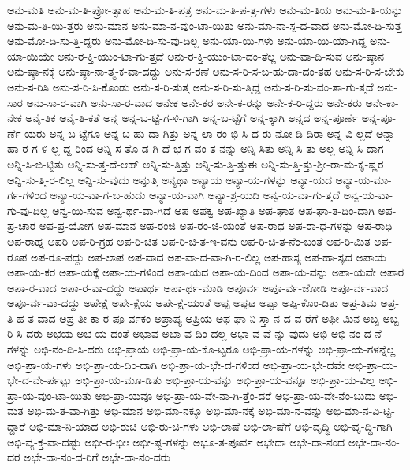 {ಅನು-ಮತಿ
ಅನು-ಮ-ತಿ-ಪ್ರೋ-ತ್ಸಾಹ
ಅನು-ಮ-ತಿ-ಪತ್ರ
ಅನು-ಮ-ತಿ-ಪ-ತ್ರ-ಗಳು
ಅನು-ಮ-ತಿಯ
ಅನು-ಮ-ತಿ-ಯನ್ನು
ಅನು-ಮ-ತಿ-ಯಿ-ತ್ತರು
ಅನು-ಮಾನ
ಅನು-ಮಾ-ನ-ವುಂ-ಟಾ-ಯಿತು
ಅನು-ಮಾ-ನಾ-ಸ್ಪ-ದ-ವಾದ
ಅನು-ಮೋ-ದಿ-ಸುತ್ತ
ಅನು-ಮೋ-ದಿ-ಸು-ತ್ತಿ-ದ್ದರು
ಅನು-ಮೋ-ದಿ-ಸು-ವು-ದಿಲ್ಲ
ಅನು-ಯಾ-ಯಿ-ಗಳು
ಅನು-ಯಾ-ಯಿ-ಯಾ-ಗಿದ್ದ
ಅನು-ಯಾ-ಯಿಯೇ
ಅನು-ರ-ಕ್ತಿ-ಯುಂ-ಟಾ-ಗು-ತ್ತದೆ
ಅನು-ರ-ಕ್ತಿ-ಯುಂ-ಟಾ-ದಂ-ತೆಲ್ಲ
ಅನು-ವಾ-ದಿ-ಸುವ
ಅನು-ಷ್ಠಾನ
ಅನು-ಷ್ಠಾ-ನಕ್ಕೆ
ಅನು-ಷ್ಠಾ-ನಾ-ತ್ಮ-ಕ-ವಾ-ದದ್ದು
ಅನು-ಸ-ರಣೆ
ಅನು-ಸ-ರಿ-ಸ-ಬ-ಹು-ದಾ-ದಂ-ತಹ
ಅನು-ಸ-ರಿ-ಸ-ಬೇಕು
ಅನು-ಸ-ರಿಸಿ
ಅನು-ಸ-ರಿ-ಸಿ-ಕೊಂಡು
ಅನು-ಸ-ರಿ-ಸುತ್ತ
ಅನು-ಸ-ರಿ-ಸು-ತ್ತಿದ್ದ
ಅನು-ಸ-ರಿ-ಸು-ವಂ-ತಾ-ಗು-ತ್ತದೆ
ಅನು-ಸಾರ
ಅನು-ಸಾ-ರ-ವಾಗಿ
ಅನು-ಸಾ-ರ-ವಾದ
ಅನೇಕ
ಅನೇ-ಕರ
ಅನೇ-ಕ-ರನ್ನು
ಅನೇ-ಕ-ರಿ-ದ್ದರು
ಅನೇ-ಕರು
ಅನೇ-ಕಾ-ನೇಕ
ಅನೈ-ತಿಕ
ಅನೈ-ತಿ-ಕತೆ
ಅನ್ನ
ಅನ್ನ-ಬ-ಟ್ಟೆ-ಗ-ಳಿ-ಗಾಗಿ
ಅನ್ನ-ಬ-ಟ್ಟೆಗೆ
ಅನ್ನ-ಕ್ಕಾಗಿ
ಅನ್ನದ
ಅನ್ನ-ಪೂರ್ಣೆ
ಅನ್ನ-ಪೂ-ರ್ಣೆ-ಯರು
ಅನ್ನ-ಬ-ಟ್ಟೆಗೂ
ಅನ್ನ-ಬ-ಹು-ದಾ-ಗಿತ್ತು
ಅನ್ನ-ಲಾ-ರಂ-ಭಿ-ಸಿ-ದ-ರು-ನೋ-ಡಿ-ದಿರಾ
ಅನ್ನ-ವಿ-ಲ್ಲದೆ
ಅನ್ನಾ-ಹಾ-ರ-ಗ-ಳಿ-ಲ್ಲ-ದ್ದ-ರಿಂದ
ಅನ್ನಿ-ಸ-ತೊ-ಡ-ಗಿ-ದೆ-ಭ-ಗ-ವಂ-ತ-ನನ್ನು
ಅನ್ನಿ-ಸಿತು
ಅನ್ನಿ-ಸಿ-ತು-ಅಲ್ಲ
ಅನ್ನಿ-ಸಿ-ದಾಗ
ಅನ್ನಿ-ಸಿ-ಬಿ-ಟ್ಟಿತು
ಅನ್ನಿ-ಸು-ತ್ತ-ದೆ-ಆಹ್
ಅನ್ನಿ-ಸು-ತ್ತಿತ್ತು
ಅನ್ನಿ-ಸು-ತ್ತಿ-ತ್ತುಈ
ಅನ್ನಿ-ಸು-ತ್ತಿ-ತ್ತು-ಶ್ರೀ-ರಾ-ಮ-ಕೃ-ಷ್ಣರ
ಅನ್ನಿ-ಸು-ತ್ತಿ-ರ-ಲಿಲ್ಲ
ಅನ್ನಿ-ಸು-ವುದು
ಅನ್ನುತ್ತಿ
ಅನ್ಯಥಾ
ಅನ್ಯಾಯ
ಅನ್ಯಾ-ಯ-ಗಳನ್ನು
ಅನ್ಯಾ-ಯದ
ಅನ್ಯಾ-ಯ-ಮಾ-ರ್ಗ-ಗಳಿಂದ
ಅನ್ಯಾ-ಯ-ವಾ-ಗ-ಬ-ಹುದು
ಅನ್ಯಾ-ಯ-ವಾಗಿ
ಅನ್ಯಾ-ಶ್ರ-ಯದಿ
ಅನ್ವ-ಯ-ವಾ-ಗು-ತ್ತದೆ
ಅನ್ವ-ಯ-ವಾ-ಗು-ವು-ದಿಲ್ಲ
ಅನ್ವ-ಯಿ-ಸುವ
ಅನ್ವ-ರ್ಥ-ವಾ-ಗಿದೆ
ಅಪ
ಅಪಕ್ವ
ಅಪ-ಖ್ಯಾತಿ
ಅಪ-ಘಾತ
ಅಪ-ಘಾ-ತ-ದಿಂ-ದಾಗಿ
ಅಪ-ಪ್ರ-ಚಾರ
ಅಪ-ಪ್ರ-ಯೋಗ
ಅಪ-ಮಾನ
ಅಪ-ರಂಜಿ
ಅಪ-ರಂ-ಜಿ-ಯಂತೆ
ಅಪ-ರಾಧ
ಅಪ-ರಾ-ಧ-ಗಳನ್ನು
ಅಪ-ರಾಧಿ
ಅಪ-ರಾಹ್ನ
ಅಪರಿ
ಅಪ-ರಿ-ಗ್ರಹ
ಅಪ-ರಿ-ಚಿತ
ಅಪ-ರಿ-ಚಿ-ತ-ಇ-ವನು
ಅಪ-ರಿ-ಚಿ-ತ-ನೆಂ-ಬಂತೆ
ಅಪ-ರಿ-ಮಿತ
ಅಪ-ರೂಪ
ಅಪ-ರೂ-ಪದ್ದು
ಅಪ-ಲಾಪ
ಅಪ-ವಾದ
ಅಪ-ವಾ-ದ-ವಾ-ಗಿ-ರ-ಲಿಲ್ಲ
ಅಪ-ಹಾಸ್ಯ
ಅಪ-ಹಾ-ಸ್ಯದ
ಅಪಾಯ
ಅಪಾ-ಯ-ಕರ
ಅಪಾ-ಯಕ್ಕೆ
ಅಪಾ-ಯ-ಗಳಿಂದ
ಅಪಾ-ಯದ
ಅಪಾ-ಯ-ದಿಂದ
ಅಪಾ-ಯ-ವನ್ನು
ಅಪಾ-ಯವೇ
ಅಪಾರ
ಅಪಾ-ರ-ವಾದ
ಅಪಾ-ರ-ವಾ-ದದ್ದು
ಅಪಾರ್ಥ
ಅಪಾ-ರ್ಥ-ಮಾಡಿ
ಅಪೂರ್ವ
ಅಪೂ-ರ್ವ-ಜೋಡಿ
ಅಪೂ-ರ್ವ-ವಾದ
ಅಪೂ-ರ್ವ-ವಾ-ದದ್ದು
ಅಪೇಕ್ಷೆ
ಅಪೇ-ಕ್ಷೆಯ
ಅಪೇ-ಕ್ಷೆ-ಯಂತೆ
ಅಪ್ಪ
ಅಪ್ಪಟ
ಅಪ್ಪಾ
ಅಪ್ಪಿ-ಕೊಂ-ಡಿತು
ಅಪ್ರ-ತಿಮ
ಅಪ್ರ-ತಿ-ಹ-ತ-ವಾದ
ಅಪ್ರ-ತೀ-ಕಾ-ರ-ಪೂ-ರ್ವಕಂ
ಅಪ್ರಾಪ್ಯ
ಅಪ್ರಿಯ
ಅಫ-ಘಾ-ನಿ-ಸ್ತಾ-ನ-ದ-ವ-ರೆಗೆ
ಅಫೀ-ಮಿನ
ಅಬ್ಬ
ಅಬ್ಬ-ರಿ-ಸಿ-ದರು
ಅಭಯ
ಅಭ-ಯ-ದಂತೆ
ಅಭಾವ
ಅಭಾ-ವ-ದಿಂ-ದಲ್ಲ
ಅಭಾ-ವ-ವೆ-ನ್ನು-ವುದು
ಅಭಿ
ಅಭಿ-ನಂ-ದ-ನೆ-ಗಳನ್ನು
ಅಭಿ-ನಂ-ದಿ-ಸಿ-ದರು
ಅಭಿ-ಪ್ರಾಯ
ಅಭಿ-ಪ್ರಾ-ಯ-ಕೊ-ಟ್ಟರೂ
ಅಭಿ-ಪ್ರಾ-ಯ-ಗಳನ್ನು
ಅಭಿ-ಪ್ರಾ-ಯ-ಗಳನ್ನೆಲ್ಲ
ಅಭಿ-ಪ್ರಾ-ಯ-ಗಳು
ಅಭಿ-ಪ್ರಾ-ಯ-ದಿಂ-ದಾಗಿ
ಅಭಿ-ಪ್ರಾ-ಯ-ಭೇ-ದ-ಗಳಿಂದ
ಅಭಿ-ಪ್ರಾ-ಯ-ಭೇ-ದವೇ
ಅಭಿ-ಪ್ರಾ-ಯ-ಭೇ-ದ-ವೇ-ರ್ಪಟ್ಟು
ಅಭಿ-ಪ್ರಾ-ಯ-ಮೂ-ಡಿತು
ಅಭಿ-ಪ್ರಾ-ಯ-ವನ್ನು
ಅಭಿ-ಪ್ರಾ-ಯ-ವನ್ನೂ
ಅಭಿ-ಪ್ರಾ-ಯ-ವಿಲ್ಲ
ಅಭಿ-ಪ್ರಾ-ಯ-ವುಂ-ಟಾ-ಯಿತು
ಅಭಿ-ಪ್ರಾ-ಯವೂ
ಅಭಿ-ಪ್ರಾ-ಯ-ವೇ-ನಾ-ಗಿ-ತ್ತೆಂ-ದರೆ
ಅಭಿ-ಪ್ರಾ-ಯ-ವೇ-ನೆಂ-ಬುದು
ಅಭಿ-ಮತ
ಅಭಿ-ಮ-ತ-ವಾ-ಗಿತ್ತು
ಅಭಿ-ಮಾನ
ಅಭಿ-ಮಾ-ನಕ್ಕೂ
ಅಭಿ-ಮಾ-ನಕ್ಕೆ
ಅಭಿ-ಮಾ-ನ-ವನ್ನು
ಅಭಿ-ಮಾ-ನ-ವಿ-ಟ್ಟಿ-ದ್ದಾರೆ
ಅಭಿ-ಮಾ-ನಿ-ಯಾದ
ಅಭಿ-ರುಚಿ
ಅಭಿ-ರು-ಚಿ-ಗಳು
ಅಭಿ-ಲಾಷೆ
ಅಭಿ-ಲಾ-ಷೆಗೆ
ಅಭಿ-ವೃದ್ಧಿ
ಅಭಿ-ವೃ-ದ್ಧಿ-ಗಾಗಿ
ಅಭಿ-ವ್ಯ-ಕ್ತ-ವಾ-ದಷ್ಟು
ಅಭೀ-ರ-ಭೀಃ
ಅಭೀ-ಷ್ಟ-ಗಳನ್ನು
ಅಭೂ-ತ-ಪೂರ್ವ
ಅಭೇದಾ
ಅಭೇ-ದಾ-ನಂದ
ಅಭೇ-ದಾ-ನಂ-ದರ
ಅಭೇ-ದಾ-ನಂ-ದ-ರಿಗೆ
ಅಭೇ-ದಾ-ನಂ-ದರು
}
